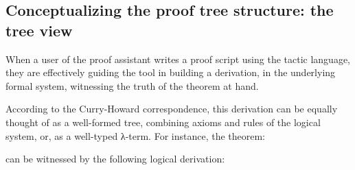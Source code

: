 \subsection{Conceptualizing the proof tree  structure: the tree view}

When a user of the \Coq{} proof assistant writes a proof script using the
\Ltac{} tactic language, they are effectively guiding the tool in building a
derivation, in the underlying formal system, witnessing the truth of the theorem
at hand.

According to the Curry-Howard correspondence, this derivation can be equally
thought of as a well-formed tree, combining axioms and rules of the logical
system, or, as a well-typed λ-term.  For instance, the theorem:

\noindent
{}

\noindent
can be witnessed by the following logical derivation:

